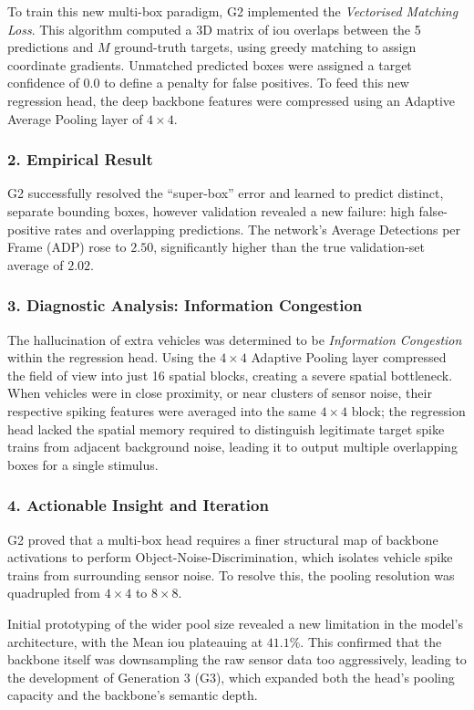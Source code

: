 To train this new multi-box paradigm, G2 implemented the \textit{Vectorised Matching Loss}.
This algorithm computed a 3D matrix of \gls{iou} overlaps between the 5 predictions and $M$ ground-truth
targets, using greedy matching to assign coordinate gradients.
%
Unmatched predicted boxes were assigned a target confidence of $0.0$ to define a penalty for false positives.
To feed this new regression head, the deep backbone features were compressed using an Adaptive Average Pooling layer of $4 \times 4$.

\subsubsection*{2. Empirical Result}
G2 successfully resolved the ``super-box'' error and learned to predict distinct, separate bounding boxes,
however validation revealed a new failure: high false-positive rates and overlapping predictions.
The network's Average Detections per Frame (ADP) rose to $2.50$, significantly higher than the true validation-set average of $2.02$.

\subsubsection*{3. Diagnostic Analysis: Information Congestion}
The hallucination of extra vehicles was determined to be \textit{Information Congestion} within the regression head.
Using the $4 \times 4$ Adaptive Pooling layer compressed the field of view into just 16 spatial blocks, creating a severe spatial bottleneck.
%
When vehicles were in close proximity, or near clusters of sensor noise, their respective spiking features were
averaged into the same $4 \times 4$ block;
%
the regression head lacked the spatial memory required to distinguish legitimate target spike trains from adjacent background noise,
leading it to output multiple overlapping boxes for a single stimulus.

\subsubsection*{4. Actionable Insight and Iteration}
G2 proved that a multi-box head requires a finer structural map of backbone activations to perform Object-Noise-Discrimination, which
isolates vehicle spike trains from surrounding sensor noise.
%
To resolve this, the pooling resolution was quadrupled from $4 \times 4$ to $8 \times 8$.

Initial prototyping of the wider pool size revealed a new limitation in the model's architecture,
with the Mean \gls{iou} plateauing at $41.1\%$.
%
This confirmed that the backbone itself was downsampling the raw sensor data too aggressively,
leading to the development of Generation 3 (G3), which expanded both the head's pooling capacity and the backbone's semantic depth.

